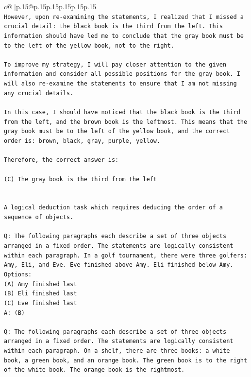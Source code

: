 \documentclass{article}
\begin{document}
{\begin{supertabular}{c@{$\;$}|p{.15\linewidth}@{}p{.15\linewidth}p{.15\linewidth}p{.15\linewidth}p{.15\linewidth}p{.15\linewidth}}
{{{\\ 
\texttt{However, upon re{-}examining the statements, I realized that I missed a crucial detail: the black book is the third from the left. This information should have led me to conclude that the gray book must be to the left of the yellow book, not to the right.} \\
\\ 
\texttt{To improve my strategy, I will pay closer attention to the given information and consider all possible positions for the gray book. I will also re{-}examine the statements to ensure that I am not missing any crucial details.} \\
\\ 
\texttt{In this case, I should have noticed that the black book is the third from the left, and the brown book is the leftmost. This means that the gray book must be to the left of the yellow book, and the correct order is: brown, black, gray, purple, yellow.} \\
\\ 
\texttt{Therefore, the correct answer is:} \\
\\ 
\texttt{(C) The gray book is the third from the left} \\
\\ 
\\ 
\texttt{A logical deduction task which requires deducing the order of a sequence of objects.} \\
\\ 
\texttt{Q: The following paragraphs each describe a set of three objects arranged in a fixed order. The statements are logically consistent within each paragraph. In a golf tournament, there were three golfers: Amy, Eli, and Eve. Eve finished above Amy. Eli finished below Amy.} \\
\texttt{Options:} \\
\texttt{(A) Amy finished last} \\
\texttt{(B) Eli finished last} \\
\texttt{(C) Eve finished last} \\
\texttt{A: (B)} \\
\\ 
\texttt{Q: The following paragraphs each describe a set of three objects arranged in a fixed order. The statements are logically consistent within each paragraph. On a shelf, there are three books: a white book, a green book, and an orange book. The green book is to the right of the white book. The orange book is the rightmost.} \\
}}}
\end{supertabular}}
\end{document}

